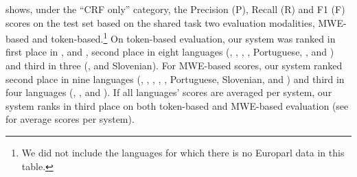 \documentclass[output=paper
,modfonts
,nonflat]{langsci/langscibook}
\begin{document}
 shows, under the ``CRF only'' category, the Precision (P), Recall (R) and F1 (F) scores on the test set based on the shared task two evaluation modalities, MWE-based and token-based.\footnote{We did not include the languages for which there is no
  Europarl data in this table.} On token-based evaluation, our system was ranked in first place in ,  and , second place in eight languages (, , , , Portuguese, ,  and ) and third in three (,  and Slovenian). For MWE-based scores, our system ranked second place in nine languages (, , , , , Portuguese, Slovenian,  and ) and third in four languages (, ,  and ). If all languages' scores are averaged per system, our system ranks in third place on both token-based and MWE-based evaluation (see  for average scores per system).
\end{document}
